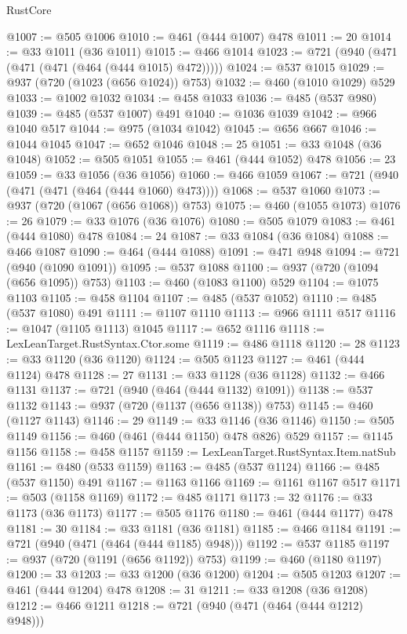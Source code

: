 \begin{lexlean}{RustCore}
\begin{coremodule}
@1007 := @505 @1006
@1010 := @461 (@444 @1007) @478
@1011 := 20
@1014 := @33 @1011 (@36 @1011)
@1015 := @466 @1014
@1023 := @721 (@940 (@471 (@471 (@471 (@464 (@444 @1015) @472)))))
@1024 := @537 @1015
@1029 := @937 (@720 (@1023 (@656 @1024)) @753)
@1032 := @460 (@1010 @1029) @529
@1033 := @1002 @1032
@1034 := @458 @1033
@1036 := @485 (@537 @980)
@1039 := @485 (@537 @1007) @491
@1040 := @1036 @1039
@1042 := @966 @1040 @517
@1044 := @975 (@1034 @1042)
@1045 := @656 @667
@1046 := @1044 @1045
@1047 := @652 @1046
@1048 := 25
@1051 := @33 @1048 (@36 @1048)
@1052 := @505 @1051
@1055 := @461 (@444 @1052) @478
@1056 := 23
@1059 := @33 @1056 (@36 @1056)
@1060 := @466 @1059
@1067 := @721 (@940 (@471 (@471 (@464 (@444 @1060) @473))))
@1068 := @537 @1060
@1073 := @937 (@720 (@1067 (@656 @1068)) @753)
@1075 := @460 (@1055 @1073)
@1076 := 26
@1079 := @33 @1076 (@36 @1076)
@1080 := @505 @1079
@1083 := @461 (@444 @1080) @478
@1084 := 24
@1087 := @33 @1084 (@36 @1084)
@1088 := @466 @1087
@1090 := @464 (@444 @1088)
@1091 := @471 @948
@1094 := @721 (@940 (@1090 @1091))
@1095 := @537 @1088
@1100 := @937 (@720 (@1094 (@656 @1095)) @753)
@1103 := @460 (@1083 @1100) @529
@1104 := @1075 @1103
@1105 := @458 @1104
@1107 := @485 (@537 @1052)
@1110 := @485 (@537 @1080) @491
@1111 := @1107 @1110
@1113 := @966 @1111 @517
@1116 := @1047 (@1105 @1113) @1045
@1117 := @652 @1116
@1118 := LexLeanTarget.RustSyntax.Ctor.some
@1119 := @486 @1118
@1120 := 28
@1123 := @33 @1120 (@36 @1120)
@1124 := @505 @1123
@1127 := @461 (@444 @1124) @478
@1128 := 27
@1131 := @33 @1128 (@36 @1128)
@1132 := @466 @1131
@1137 := @721 (@940 (@464 (@444 @1132) @1091))
@1138 := @537 @1132
@1143 := @937 (@720 (@1137 (@656 @1138)) @753)
@1145 := @460 (@1127 @1143)
@1146 := 29
@1149 := @33 @1146 (@36 @1146)
@1150 := @505 @1149
@1156 := @460 (@461 (@444 @1150) @478 @826) @529
@1157 := @1145 @1156
@1158 := @458 @1157
@1159 := LexLeanTarget.RustSyntax.Item.natSub
@1161 := @480 (@533 @1159)
@1163 := @485 (@537 @1124)
@1166 := @485 (@537 @1150) @491
@1167 := @1163 @1166
@1169 := @1161 @1167 @517
@1171 := @503 (@1158 @1169)
@1172 := @485 @1171
@1173 := 32
@1176 := @33 @1173 (@36 @1173)
@1177 := @505 @1176
@1180 := @461 (@444 @1177) @478
@1181 := 30
@1184 := @33 @1181 (@36 @1181)
@1185 := @466 @1184
@1191 := @721 (@940 (@471 (@464 (@444 @1185) @948)))
@1192 := @537 @1185
@1197 := @937 (@720 (@1191 (@656 @1192)) @753)
@1199 := @460 (@1180 @1197)
@1200 := 33
@1203 := @33 @1200 (@36 @1200)
@1204 := @505 @1203
@1207 := @461 (@444 @1204) @478
@1208 := 31
@1211 := @33 @1208 (@36 @1208)
@1212 := @466 @1211
@1218 := @721 (@940 (@471 (@464 (@444 @1212) @948)))

\end{coremodule}
\end{lexlean}
